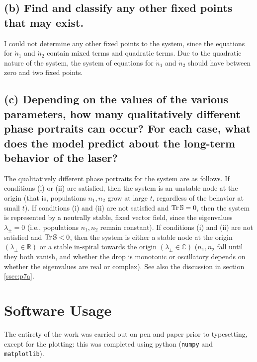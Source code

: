 \documentclass[draft]{agujournal2019}
\begin{document}
\subsection{(b) Find and classify any other fixed points that may exist.}
\label{ssec:p7b}

I could not determine any other fixed points to the system, since the equations for $\dot n_1$ and $\dot n_2$ contain mixed terms and quadratic terms. Due to the quadratic nature of the system, the system of equations for $\dot n_1$ and $\dot n_2$ should have between zero and two fixed points.  



\subsection{(c) Depending on the values of the various parameters, how many qualitatively different phase portraits can occur? For each case, what does the model predict about the long-term behavior of the laser?}
\label{ssec:p7c}

The qualitatively different phase portraits for the system are as follows. If conditions (i) or (ii) are satisfied, then the system is an unstable node at the origin (that is, populations $n_1,n_2$ grow at large $t$, regardless of the behavior at small $t$). If conditions (i) and (ii) are not satisfied and $\mathrm{Tr}\,\mathbb{S}=0$, then the system is represented by a neutrally stable, fixed vector field, since the eigenvalues $
\lambda_\pm=0$ (i.e., populations $n_1,n_2$ remain constant). If conditions (i) and (ii) are not satisfied and $\mathrm{Tr}\,\mathbb{S}<0$, then the system is either a stable node at the origin $(\lambda_\pm\in\mathbb{R})$ or a stable in-spiral towards the origin $(\lambda_\pm\in\mathbb{C})$ ($n_1,n_2$ fall until they both vanish, and whether the drop is monotonic or oscillatory depends on whether the eigenvalues are real or complex). See also the discussion in section \ref{ssec:p7a}.











\clearpage
\section{Software Usage}
The entirety of the work was carried out on pen and paper prior to typesetting, except for the plotting: this was completed using python (\verb|numpy| and \verb|matplotlib|). 

\newpage















%
\end{document}
